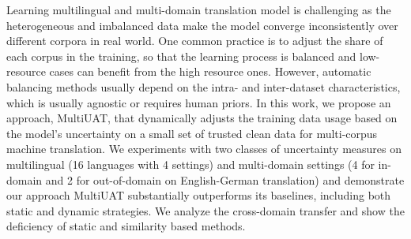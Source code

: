 Learning multilingual and multi-domain translation model is challenging as the heterogeneous and imbalanced data make the model converge inconsistently over different corpora in real world. One common practice is to adjust the share of each corpus in the training, so that the learning process is balanced and low-resource cases can benefit from the high resource ones. However, automatic balancing methods usually depend on the intra- and inter-dataset characteristics, which is usually agnostic or requires human priors. In this work, we propose an approach, MultiUAT, that dynamically adjusts the training data usage based on the model's uncertainty on a small set of trusted clean data for multi-corpus machine translation. We experiments with two classes of uncertainty measures on multilingual (16 languages with 4 settings) and multi-domain settings (4 for in-domain and 2 for out-of-domain on English-German translation) and demonstrate our approach MultiUAT substantially outperforms its baselines, including both static and dynamic strategies. We analyze the cross-domain transfer and show the deficiency of static and similarity based methods.
